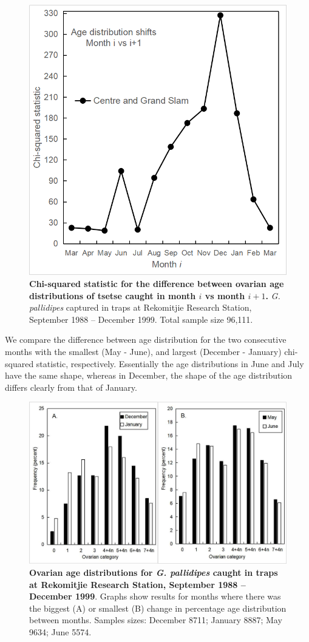 \documentclass[12pt,a4paper]{article}
\begin{document}
\begin{figure}[hbt!]
	\centering
	\includegraphics[width=0.7\linewidth]{ChiSqrSttistic}
	\caption{{\bf Chi-squared statistic for the difference between ovarian age distributions of tsetse caught in month $i$ vs month $i+1$.} \textit{G. pallidipes} captured in traps at Rekomitjie Research Station, September 1988 – December 1999. Total sample size 96,111. }
	\label{fig:ChiSqrSttistic}
\end{figure}

We compare the difference between age distribution for the two consecutive months with the smallest (May - June), and largest (December - January) chi-squared statistic, respectively. Essentially the age distributions in June and July have the same shape, whereas in December, the shape of the age distribution differs clearly from that of January. 
\begin{figure}[hbt!]
	\centering
	\includegraphics[width=0.9\linewidth]{AgeDistJUNJULDECJAN}
	\caption{{\bf Ovarian age distributions for \textit{G. pallidipes} caught in traps at Rekomitjie Research Station, September 1988 – December 1999}.  Graphs show results for months where there was the biggest (A) or smallest (B) change in percentage age distribution between months. Samples sizes: December 8711; January 8887; May 9634; June 5574. }
	\label{fig:AgeDistJUNJULDECJAN}
\end{figure}
\end{document}
